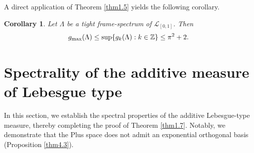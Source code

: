 \documentclass[12pt,psfig,reqno]{amsart}
\numberwithin{equation}{section}
\theoremstyle{plain}
\newtheorem{cor}[thm]{Corollary}
\begin{document}
A direct application of Theorem \ref{thm1.5} yields the following corollary.

\begin{cor}\label{thm3.2}
	Let $\Lambda$ be a tight frame-spectrum of $\mathcal{L}_{[0,1]}$. 
	Then \[
 g_{\max}(\Lambda)\leq \sup\{g_k(\Lambda):k\in\Bbb Z\}\leq\pi^2+2.
	\]
\end{cor}



\section{Spectrality of the additive measure of Lebesgue type}
In this section, we establish the spectral properties of the additive Lebesgue-type measure, thereby completing the proof of Theorem \ref{thm1.7}. Notably, we demonstrate that the Plus space does not admit an exponential orthogonal basis (Proposition \ref{thm4.3}).
\end{document}

